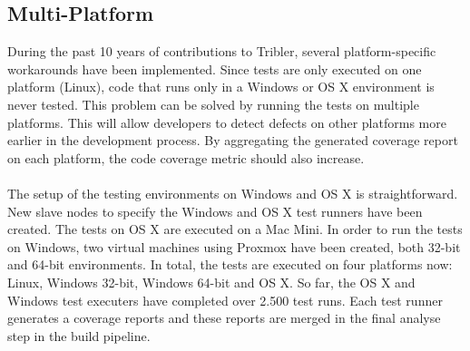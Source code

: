 \subsection{Multi-Platform}
During the past 10 years of contributions to Tribler, several platform-specific workarounds have been implemented. Since tests are only executed on one platform (Linux), code that runs only in a Windows or OS X environment is never tested. This problem can be solved by running the tests on multiple platforms. This will allow developers to detect defects on other platforms more earlier in the development process. By aggregating the generated coverage report on each platform, the code coverage metric should also increase.\\\\
The setup of the testing environments on Windows and OS X is straightforward. New slave nodes to specify the Windows and OS X test runners have been created. The tests on OS X are executed on a Mac Mini. In order to run the tests on Windows, two virtual machines using Proxmox have been created, both 32-bit and 64-bit environments. In total, the tests are executed on four platforms now: Linux, Windows 32-bit, Windows 64-bit and OS X. So far, the OS X and Windows test executers have completed over 2.500 test runs. Each test runner generates a coverage reports and these reports are merged in the final analyse step in the build pipeline.

